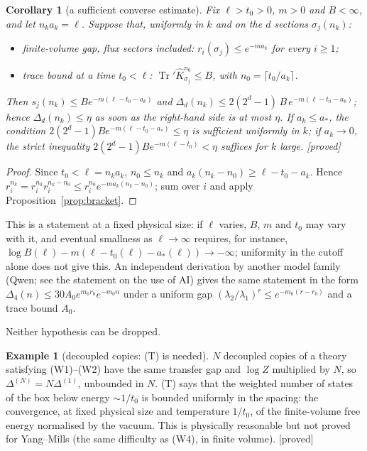 \documentclass[11pt,a4paper]{article}
\theoremstyle{plain}
\newtheorem{corollary}[theorem]{Corollary}
\theoremstyle{definition}
\newtheorem{example}[theorem]{Example}
\theoremstyle{remark}
\numberwithin{equation}{section}
\newcommand{\Tr}{\operatorname{Tr}}
\newcommand{\Kh}{\widehat K}
\newcommand{\st}[1]{\textsf{[#1]}}
\begin{document}
\begin{corollary}[a sufficient converse estimate]\label{cor:converse}
Fix $\ell>t_0>0$, $m>0$ and $B<\infty$, and let $n_ka_k=\ell$. Suppose that, uniformly in $k$ and on the $d$ sections $\sigma_j(n_k)$:
\begin{itemize}
\item[(G$_{\mathrm{fv}}$)] \emph{finite-volume gap, flux sectors included}: $r_i(\sigma_j)\le e^{-ma_k}$ for every $i\ge1$;
\item[(T)] \emph{trace bound at a time $t_0<\ell$}: $\Tr'\Kh_{\sigma_j}^{n_0}\le B$, with $n_0=\lceil t_0/a_k\rceil$.
\end{itemize}
Then $s_j(n_k)\le Be^{-m(\ell-t_0-a_k)}$ and $\Delta_d(n_k)\le2(2^d-1)\,B\,e^{-m(\ell-t_0-a_k)}$; hence $\Delta_d(n_k)\le\eta$ as soon as the right-hand
side is at most $\eta$. If $a_k\le a_*$, the condition $2(2^d-1)Be^{-m(\ell-t_0-a_*)}\le\eta$ is sufficient uniformly in $k$; if $a_k\to0$, the strict
inequality $2(2^d-1)Be^{-m(\ell-t_0)}<\eta$ suffices for $k$ large. \st{proved}
\end{corollary}
\begin{proof}
Since $t_0<\ell=n_ka_k$, $n_0\le n_k$ and $a_k(n_k-n_0)\ge\ell-t_0-a_k$. Hence $r_i^{n_k}=r_i^{n_0}r_i^{n_k-n_0}\le r_i^{n_0}e^{-ma_k(n_k-n_0)}$; sum over $i$ and
apply Proposition~\ref{prop:bracket}.
\end{proof}
This is a statement at a fixed physical size: if $\ell$ varies, $B$, $m$ and $t_0$ may vary with it, and eventual smallness as $\ell\to\infty$
requires, for instance, $\log B(\ell)-m(\ell-t_0(\ell)-a_*(\ell))\to-\infty$; uniformity in the cutoff alone does not give this.
An independent derivation by another model family (Qwen; see the statement on the use of AI) gives the same statement in the form
$\Delta_4(n)\le30A_0e^{m_0r_0}e^{-m_0n}$ under a uniform gap $(\lambda_2/\lambda_1)^r\le e^{-m_0(r-r_0)}$ and a trace bound $A_0$.

Neither hypothesis can be dropped.
\begin{example}[decoupled copies: (T) is needed]\label{ex:copies}
$N$ decoupled copies of a theory satisfying (W1)--(W2) have the same transfer gap and $\log Z$ multiplied by $N$, so
$\Delta^{(N)}=N\Delta^{(1)}$, unbounded in $N$. (T) says that the weighted number of states of the box below energy $\sim1/t_0$ is bounded
uniformly in the spacing: the convergence, at fixed physical size and temperature $1/t_0$, of the finite-volume free energy normalised by
the vacuum. This is physically reasonable but not proved for Yang--Mills (the same difficulty as (W4), in finite volume). \st{proved}
\end{example}
\end{document}
